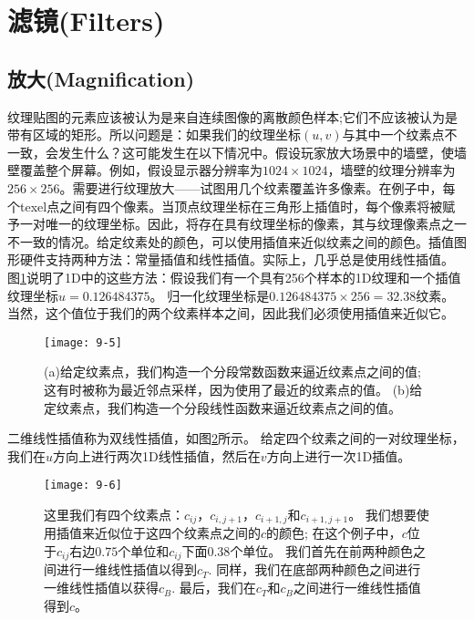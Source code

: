 \section{滤镜(Filters)}
\subsection{放大(Magnification)}
\begin{flushleft}
纹理贴图的元素应该被认为是来自连续图像的离散颜色样本;它们不应该被认为是带有区域的矩形。所以问题是：如果我们的纹理坐标$(u,v)$与其中一个纹素点不一致，会发生什么？这可能发生在以下情况中。假设玩家放大场景中的墙壁，使墙壁覆盖整个屏幕。例如，假设显示器分辨率为$1024\times 1024$，墙壁的纹理分辨率为$256\times 256$。需要进行纹理放大——试图用几个纹素覆盖许多像素。在例子中，每个texel点之间有四个像素。当顶点纹理坐标在三角形上插值时，每个像素将被赋予一对唯一的纹理坐标。因此，将存在具有纹理坐标的像素，其与纹理像素点之一不一致的情况。给定纹素处的颜色，可以使用插值来近似纹素之间的颜色。插值图形硬件支持两种方法：常量插值和线性插值。实际上，几乎总是使用线性插值。\\

图\ref{fig:9-5}说明了1D中的这些方法：假设我们有一个具有256个样本的1D纹理和一个插值纹理坐标$u=0.126484375$。 归一化纹理坐标是$0.126484375\times 256 = 32.38$纹素。 当然，这个值位于我们的两个纹素样本之间，因此我们必须使用插值来近似它。\\
\end{flushleft}

\begin{figure}[h]
    \label{fig:9-5}
    \texttt{[image: 9-5]}
    \centering
    \caption{(a)给定纹素点，我们构造一个分段常数函数来逼近纹素点之间的值; 这有时被称为最近邻点采样，因为使用了最近的纹素点的值。 (b)给定纹素点，我们构造一个分段线性函数来逼近纹素点之间的值。}
\end{figure}

\begin{flushleft}
二维线性插值称为双线性插值，如图\ref{fig:9-6}所示。 给定四个纹素之间的一对纹理坐标，我们在$u$方向上进行两次1D线性插值，然后在$v$方向上进行一次1D插值。
\end{flushleft}

\begin{figure}[h]
    \label{fig:9-6}
    \texttt{[image: 9-6]}
    \centering
    \caption{这里我们有四个纹素点：$c_{ij}$，$c_{i,j+1}$，$c_{i+1,j}$和$c_{i+1,j+1}$。 我们想要使用插值来近似位于这四个纹素点之间的$c$的颜色; 在这个例子中，$c$位于$c_{ij}$右边$0.75$个单位和$c_{ij}$下面$0.38$个单位。 我们首先在前两种颜色之间进行一维线性插值以得到$c_{T}$. 同样，我们在底部两种颜色之间进行一维线性插值以获得$c_{B}$. 最后，我们在$c_{T}$和$c_{B}$之间进行一维线性插值得到$c$。}
\end{figure}

